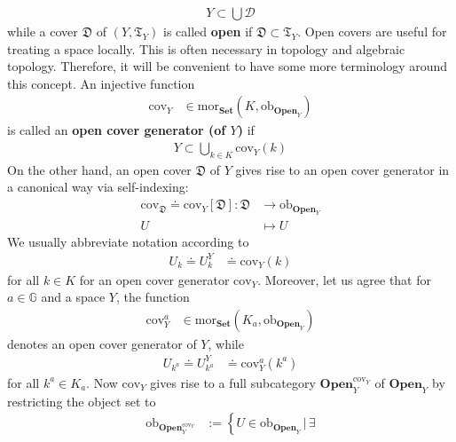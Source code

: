 \begin{exa}
\begin{enumerate}
\begin{align*}
  Y
  \subset
  \bigcup
  \mathcal{D}
\end{align*}
while a cover $\mathfrak{D}$ of $(Y,\mathfrak{T}_{Y})$ is called \textbf{open} if $\mathfrak{D} \subset \mathfrak{T}_{Y}$.
Open covers are useful for treating a space locally.
This is often necessary in topology and algebraic topology.
Therefore, it will be convenient to have some more terminology around this concept.
An injective function
\begin{align*}
  \mathrm{cov}_{Y}
  &\in
  \mathrm{mor}_{\mathbf{Set}}
  \left(
    K,
    \mathrm{ob}_{\mathbf{Open}_{Y}}
  \right)
\end{align*}
is called an \textbf{open cover generator (of $Y$)} if
\begin{align*}
  Y
  \subset
  \bigcup_{k \in K}
  \mathrm{cov}_{Y}(k)
\end{align*}
On the other hand, an open cover $\mathfrak{D}$ of $Y$ gives rise to an open cover generator in a canonical way via self-indexing:
\begin{align*}
  \mathrm{cov}_{\mathfrak{D}}
  \doteq
  \mathrm{cov}_{Y}[\mathfrak{D}]
  \colon
  \mathfrak{D}
  &\rightarrow
  \mathrm{ob}_{\mathbf{Open}_{Y}}
  \\
  U
  &\mapsto
  U
\end{align*}
We usually abbreviate notation according to
\begin{align*}
  U_{k}
  \doteq
  U_{k}^{Y}
  &\doteq
  \mathrm{cov}_{Y}(k)
\end{align*}
for all $k \in K$ for an open cover generator $\mathrm{cov}_{Y}$.
Moreover, let us agree that for $a \in \mathbb{G}$ and a space $Y$, the function
\begin{align*}
  \mathrm{cov}_{Y}^{a}
  &\in
  \mathrm{mor}_{\mathbf{Set}}
  \left(
    K_{a},
    \mathrm{ob}_{\mathbf{Open}_{Y}}
  \right)
\end{align*}
denotes an open cover generator of $Y$, while
\begin{align*}
  U_{k^{a}}
  \doteq
  U_{k^{a}}^{Y}
  &\doteq
  \mathrm{cov}_{Y}^{a}(k^{a})
\end{align*}
for all $k^{a} \in K_{a}$.
Now $\mathrm{cov}_{Y}$ gives rise to a full subcategory $\mathbf{Open}_{Y}^{\mathrm{cov}_{Y}}$ of $\mathbf{Open}_{Y}$ by restricting the object set to
\begin{align*}
  \mathrm{ob}_{\mathbf{Open}_{Y}^{\mathrm{cov}_{Y}}}
  &:=
  \left\lbrace
      U
      \in
      \mathrm{ob}_{\mathbf{Open}_{Y}}
    \,
    \vert
    \,
      \exists

\end{align*}
\end{enumerate}
\end{exa}
